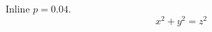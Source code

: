 \documentclass{article}
\begin{document}
Inline $p=0.04$.
\begin{equation}x^2+y^2=z^2\label{eq:p}\end{equation}
\end{document}
